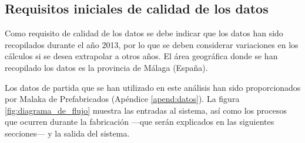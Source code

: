 \subsection{Requisitos iniciales de calidad de los datos}
Como requisito de calidad de los datos se debe indicar que los datos han sido recopilados durante el año 2013, por lo que se deben considerar variaciones en los cálculos si se desea extrapolar a otros años. El área geográfica donde se han recopilado los datos es la provincia de Málaga (España).

Los datos de partida que se han utilizado en este análisis han sido proporcionados por Malaka de Prefabricados (Apéndice \ref{apend:datos}). La figura \ref{fig:diagrama_de_flujo} muestra las entradas al sistema, así como los procesos que ocurren durante la fabricación —que serán explicados en las siguientes secciones— y la salida del sistema.

